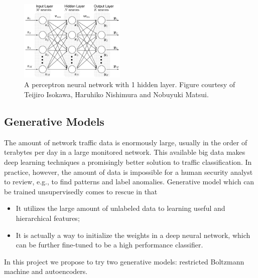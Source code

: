 \begin{figure}[h]
\centering
\includegraphics[width=0.45\textwidth]{figures/multilayer_perceptron.png}
\caption{A perceptron neural network with 1 hidden layer.
        Figure courtesy of Teijiro Isokawa, Haruhiko Nishimura and Nobuyuki Matsui.}
\label{Fig:MLPArchitecture}
\end{figure}

\subsection{Generative Models}
The amount of network traffic data is enormously large, usually in the order of terabytes
per day in a large monitored network.
This available big data makes deep learning techniques a promisingly better solution
to traffic classification.
In practice, however, the amount of data is impossible for a human security analyst to review,
e.g., to find patterns and label anomalies.
Generative model which can be trained unsupervisedly comes to rescue in that
\begin{itemize}
\item It utilizes the large amount of unlabeled data to learning useful and hierarchical features;
\item It is actually a way to initialize the weights in a deep neural network, which can be
        further fine-tuned to be a high performance classifier.
\end{itemize}
In this project we propose to try two generative models: restricted Boltzmann machine and autoencoders.

